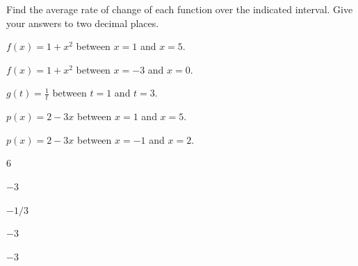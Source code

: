 



\begin{exercise}
Find the average rate of change of each function over the indicated interval. Give your answers to two decimal places.

    \begin{parts}
        \item $f(x)=1+x^2$ between $x=1$ and $x=5$.
        
        \item $f(x)=1+x^2$ between $x=-3$ and $x=0$.

        
        \item $\displaystyle g(t)=\frac{1}{t}$ between $t=1$ and $t=3$.

        
        \item $p(x)=2-3x$ between $x=1$ and $x=5$.

        \item $p(x)=2-3x$ between $x=-1$ and $x=2$.
    \end{parts}
\end{exercise}


\begin{solution}
    \begin{parts}
        \item $6$
        \item $-3$
        \item $-1/3$
        \item $-3$
        \item $-3$
    \end{parts}
\end{solution}






